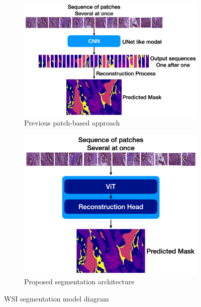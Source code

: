 \documentclass[rebuttal]{cvpr}
\begin{document}
    \begin{figure}[ht]
        \begin{subfigure}{0.5\textwidth}
            \centering
            \includegraphics[width=0.8\linewidth]{media/previous-patch-based-approach.png}
            \caption{Previous patch-based approach}
            \label{fig:prev}
        \end{subfigure}
        \begin{subfigure}{0.5\textwidth}
            \centering
            \includegraphics[width=0.8\linewidth]{media/proposed-seg.png}
            \caption{Proposed segmentation architecture}
            \label{fig:prop}
        \end{subfigure}
        \caption{WSI segmentation model diagram}
        \label{fig:seg}
    \end{figure}

% 
% 
\end{document}
